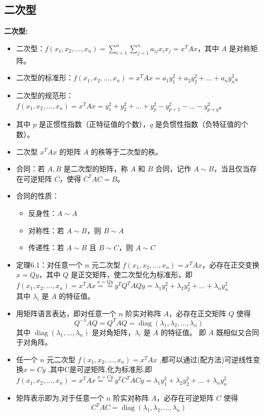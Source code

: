 \documentclass[10pt]{article}
\begin{document}
\begin{multicols}{2}
\section*{二次型}

\textbf{二次型:}

\begin{itemize}
  \item 二次型：\( f(x_1, x_2, \ldots, x_n) = \sum_{i=1}^n \sum_{j=1}^n a_{ij} x_i x_j = x^{T} A x \)，其中 \(A\) 是对称矩阵。
  \item 二次型的标准形：\( f(x_1, x_2, \ldots, x_n) = x^{T} A x = a_1 y_1^2 + a_2 y_2^2 + \ldots + a_n y_n^2 \)。
  \item 二次型的规范形：\( f(x_1, x_2, \ldots, x_n) = x^{T} A x = y_1^2 + y_2^2 + \ldots + y_p^2 - y_{p+1}^2 - \ldots - y_{p+q}^2 \)。
  \item 其中 \(p\) 是正惯性指数（正特征值的个数），\(q\) 是负惯性指数（负特征值的个数）。
  \item 二次型 \(x^{T} A x\) 的矩阵 \(A\) 的秩等于二次型的秩。
  \item 合同：若 \(A, B\) 是二次型的矩阵，称 \(A\) 和 \(B\) 合同，记作 \(A \sim B\)，当且仅当存在可逆矩阵 \(C\)，使得 \(C^{T} A C = B\)。
  \item 合同的性质：
    \begin{itemize}
      \item 反身性：\(A \sim A\)
      \item 对称性：若 \(A \sim B\)，则 \(B \sim A\)
      \item 传递性：若 \(A \sim B\) 且 \(B \sim C\)，则 \(A \sim C\)
    \end{itemize}
  \item 定理6.1：对任意一个 \(n\) 元二次型 \(f(x_1, x_2, \ldots, x_n) = x^{T} A x\)，必存在正交变换 \(x = Qy\)，其中 \(Q\) 是正交矩阵，使二次型化为标准形，即 \\
  \(
    f(x_1, x_2, \ldots, x_n) = x^{T} A x \stackrel{x=Qy}{==} 
    y^{T} Q^{T} A Q y = \lambda_1 y_1^2 + \lambda_2 y_2^2 + \ldots + \lambda_n y_n^2
  \)
  \\
  其中 \(\lambda_i\) 是 \(A\) 的特征值。
  \item 用矩阵语言表达，即对任意一个 \(n\) 阶实对称阵 \(A\)，必存在正交矩阵 \(Q\) 使得
  \[
    Q^{-1} A Q = Q^{T} A Q = \operatorname{diag}(\lambda_1, \lambda_2, \ldots, \lambda_n)
  \]
  其中 \(\operatorname{diag}(\lambda_1, \ldots, \lambda_n)\) 是对角矩阵，\(\lambda_i\) 是 \(A\) 的特征值。
  即 \(A\) 既相似又合同于对角阵。

  \item 任一个 \(n\) 元二次型 \(f(x_1, x_2, \ldots, x_n) = x^{T} A x\) ,都可以通过(配方法)可逆线性变换\( x = Cy \) ,其中C是可逆矩阵,化为标准形,即
  \( f(x_1, x_2, \ldots, x_n) = x^{T}Ax \stackrel{x=Cy}{==} y^{T}C^{T}ACy = \lambda_1 y_1^2 + \lambda_2 y_2^2 + \ldots + \lambda_n y_n^2 \)
  \item 矩阵表示即为,对于任意一个 \(n\) 阶实对称阵 \(A\)，必存在可逆矩阵 \(C\) 使得
  \[
    C^{T} A C = \operatorname{diag}(\lambda_1, \lambda_2, \ldots, \lambda_n)
  \]


\end{itemize}
\end{multicols}
\end{document}
